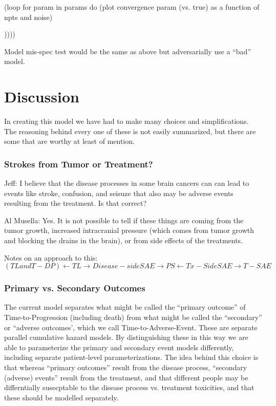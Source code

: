 \documentclass[twocolumn]{bmcart}%
\begin{document}
     (loop for param in params
           do 
           (plot convergence param (vs. true) as a function of npts and noise)

           ))))

Model mis-spec test would be the same as above but adversarially use a
``bad'' model.

\section{Discussion}\label{sec:discussion}

In creating this model we have had to make many choices and
simplifications. The reasoning behind every one of these is not easily
summarized, but there are some that are worthy at least of mention.

\subsubsection{Strokes from Tumor or Treatment?}\label{sec:model-issue-parallel-saes}

Jeff: I believe that the disease processes in some brain cancers can
can lead to events like stroke, confusion, and seisuze that also may
be adverse events resulting from the treatment. Is that correct?

Al Musella: Yes. It is not possible to tell if these things are coming
from the tumor growth, increased intracranial pressure (which comes
from tumor growth and blocking the drains in the brain), or from side
effects of the treatments.

Notes on an approach to this: $(TL and T-DP) \leftarrow TL \rightarrow Disease-side SAE \rightarrow PS \leftarrow Tx-Side SAE \rightarrow T-SAE$

\subsubsection{Primary vs. Secondary Outcomes}\label{sec:model-struct-issues-pso}

The current model separates what might be called the ``primary
outcome'' of Time-to-Progression (including death) from what might be
called the ``secondary'' or ``adverse outcomes', which we call
Time-to-Adverse-Event. These are separate parallel cumulative hazard
models. By distinguishing these in this way we are able to
parameterize the primary and secondary event models differently,
including separate patient-level parameterizations. The idea behind
this choice is that whereas ``primary outcomes'' result from the
disease process, ``secondary (adverse) events'' result from the
treatment, and that different people may be differntially susecptable
to the disease process vs. treatment toxicities, and that these should
be modelled separately.
\end{document}

